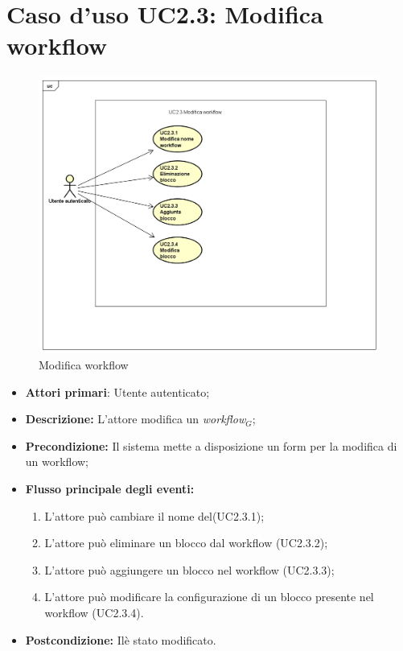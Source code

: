 		\section{Caso d'uso UC2.3: Modifica workflow}
		\begin{figure} [h]
			\centering
			\includegraphics[scale=0.4]{./Diagram/UC2-3.png}
			\caption{Modifica workflow }\label{}
		\end{figure}
		\begin{itemize}
			\item \textbf{Attori primari}: Utente autenticato;
			\item \textbf{Descrizione:} L'attore modifica un \textit{workflow$_{G}$};
			\item \textbf{Precondizione:} Il sistema mette a disposizione un form per la modifica di un workflow;
			\item \textbf{Flusso principale degli eventi:}
			\begin{enumerate}
				\item L'attore può cambiare il nome del(UC2.3.1);
				\item L'attore può eliminare un blocco dal workflow (UC2.3.2);
				\item L'attore può aggiungere un blocco nel workflow (UC2.3.3);
				\item L'attore può modificare la configurazione di un blocco presente nel workflow (UC2.3.4).
			\end{enumerate}
			\item \textbf{Postcondizione:} Ilè stato modificato.
		\end{itemize}
